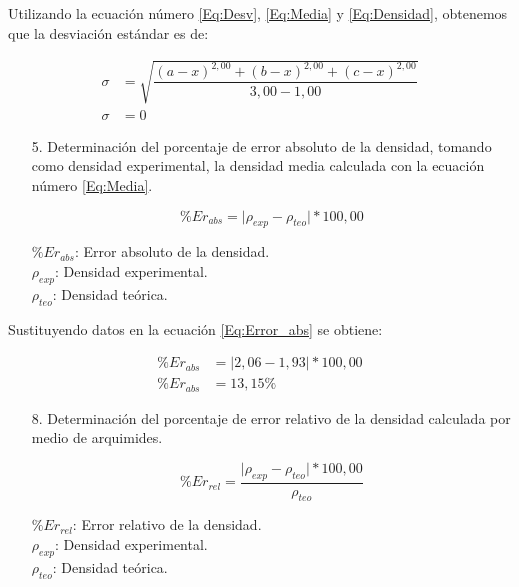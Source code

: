 \documentclass[12pt,letterpaper]{article}
\newcommand{\abs}[1]{\lvert#1\rvert}
\begin{document}
Utilizando la ecuación número \ref{Eq:Desv}, \ref{Eq:Media} y \ref{Eq:Densidad}, obtenemos que la desviación estándar es de:

\begin{align*}
\sigma &= \sqrt{\dfrac{(a - x)^{2,00} + (b - x)^{2,00} + (c - x)^{2,00}}{3,00-1,00}}\\
\sigma &= 0
\end{align*}


\begin{enumerate}
	\item[5.] Determinación del porcentaje de error absoluto de la densidad, tomando como densidad experimental, la densidad media calculada con la ecuación número \ref{Eq:Media}.
	
\begin{equation}
\% Er_{abs} = \abs{\rho_{exp} - \rho_{teo}}*100,00
\end{equation}

$\% Er_{abs}$: Error absoluto de la densidad.\\

$\rho_{exp}$: Densidad experimental.\\

$\rho_{teo}$: Densidad teórica.

\end{enumerate}

Sustituyendo datos en la ecuación \ref{Eq:Error_abs} se obtiene:

\begin{align*}
\% Er_{abs} &= \abs{2,06 - 1,93}*100,00\\
\% Er_{abs} &= 13,15 \%
\end{align*}


\begin{enumerate}
	\item[8.] Determinación del porcentaje de error relativo de la densidad calculada por medio de arquimides.
	
\begin{equation}
\% Er_{rel} = \dfrac{\abs{\rho_{exp} - \rho_{teo}}*100,00}{\rho_{teo}}
\end{equation}

$\% Er_{rel}$: Error relativo de la densidad.\\

$\rho_{exp}$: Densidad experimental.\\

$\rho_{teo}$: Densidad teórica.

\end{enumerate}
\end{document}
